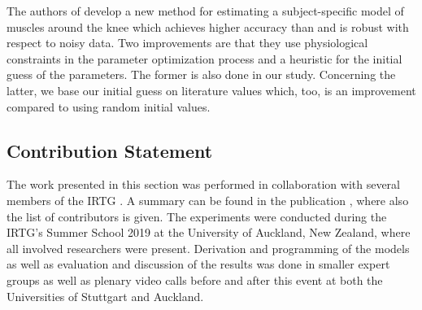 The authors of \cite{Campen2014} develop a new method for estimating a subject-specific model of muscles around the knee which achieves higher accuracy than \cite{Garner2003} and is robust with respect to noisy data. Two improvements are that they use physiological constraints in the parameter optimization process and a heuristic for the initial guess of the parameters. The former is also done in our study. Concerning the latter, we base our initial guess on literature values which, too, is an improvement compared to using random initial values.

\subsection{Contribution Statement}

The work presented in this section was performed in collaboration with several members of the IRTG . A summary can be found in the publication \cite{summerschool2019}, where also the list of contributors is given.
The experiments were conducted during the IRTG's Summer School 2019 at the University of Auckland, New Zealand, where all involved researchers were present. Derivation and programming of the models as well as evaluation and discussion of the results was done in smaller expert groups as well as plenary video calls before and after this event at both the Universities of Stuttgart and Auckland.

